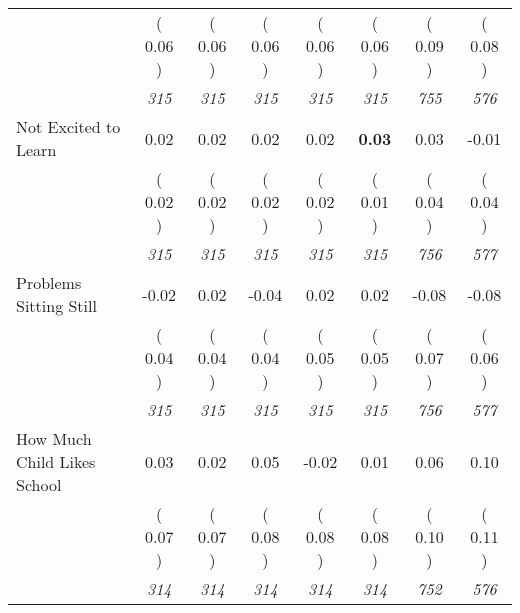 \begin{tabular}{l c c c c c c c}
& (     0.06 ) & (     0.06 ) & (     0.06 ) & (     0.06 ) & (     0.06 ) & (     0.09 ) & (     0.08 ) \\
& \textit{ 315 } & \textit{ 315 } & \textit{ 315 } & \textit{ 315 } & \textit{ 315 } & \textit{ 755 } & \textit{ 576 } \\
Not Excited to Learn &      0.02 &      0.02 &      0.02 &      0.02 & \textbf{     0.03} &      0.03 &     -0.01 \\
& (     0.02 ) & (     0.02 ) & (     0.02 ) & (     0.02 ) & (     0.01 ) & (     0.04 ) & (     0.04 ) \\
& \textit{ 315 } & \textit{ 315 } & \textit{ 315 } & \textit{ 315 } & \textit{ 315 } & \textit{ 756 } & \textit{ 577 } \\
Problems Sitting Still &     -0.02 &      0.02 &     -0.04 &      0.02 &      0.02 &     -0.08 &     -0.08 \\
& (     0.04 ) & (     0.04 ) & (     0.04 ) & (     0.05 ) & (     0.05 ) & (     0.07 ) & (     0.06 ) \\
& \textit{ 315 } & \textit{ 315 } & \textit{ 315 } & \textit{ 315 } & \textit{ 315 } & \textit{ 756 } & \textit{ 577 } \\
How Much Child Likes School &      0.03 &      0.02 &      0.05 &     -0.02 &      0.01 &      0.06 &      0.10 \\
& (     0.07 ) & (     0.07 ) & (     0.08 ) & (     0.08 ) & (     0.08 ) & (     0.10 ) & (     0.11 ) \\
& \textit{ 314 } & \textit{ 314 } & \textit{ 314 } & \textit{ 314 } & \textit{ 314 } & \textit{ 752 } & \textit{ 576 } \\
\bottomrule
\end{tabular}
